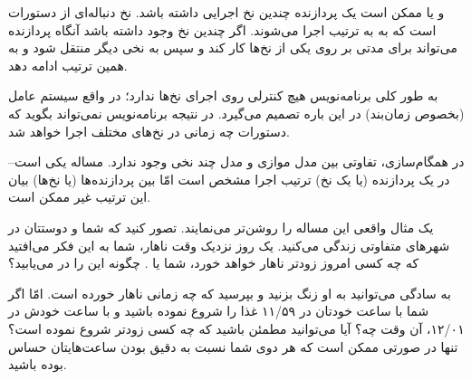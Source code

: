 \documentclass{book}
\begin{document}
    و یا ممکن است یک پردازنده چندین نخ اجرایی داشته باشد. نخ دنباله‌ای از دستورات است که به به ترتیب اجرا می‌شوند. 
    اگر چندین نخ وجود داشته باشد آنگاه پردازنده می‌تواند برای مدتی بر روی یکی  از نخ‌ها کار کند و سپس به نخی دیگر منتقل شود و به همین 
    ترتیب ادامه دهد. 

    به طور کلی برنامه‌نویس هیچ کنترلی روی اجرای نخ‌ها ندارد؛ در واقع سیستم عامل (بخصوص زمان‌بند) در این باره تصمیم‌ می‌گیرد. 
    در نتیجه برنامه‌نویس نمی‌تواند بگوید که دستورات چه زمانی در نخ‌های مختلف اجرا خواهد شد.
    

    در همگام‌سازی، تفاوتی بین مدل موازی و مدل چند نخی وجود ندارد. 
    مساله یکی است--در یک پردازنده (یا یک نخ) ترتیب اجرا مشخص است امّا بین پردازنده‌ها (یا نخ‌ها) بیان این ترتیب غیر ممکن است. 
    
    یک مثال واقعی این مساله را روشن‌تر می‌نمایند. 
    تصور کنید که شما و دوستتان  در شهرهای متفاوتی زندگی می‌کنید. یک روز نزدیک وقت ناهار، شما به این فکر می‌افتید که 
    چه کسی امروز زودتر ناهار خواهد خورد، شما یا . چگونه این را در می‌یابید؟ 
    

    به سادگی می‌توانید به او زنگ بزنید و بپرسید که چه زمانی ناهار خورده است. امّا اگر شما با ساعت خودتان در ۱۱/۵۹ غذا را شروع نموده باشید 
    و  با ساعت خودش در ۱۲/۰۱، آن وقت چه؟ آیا می‌توانید مطمئن باشید که چه کسی زودتر شروع نموده است؟ 
    تنها در صورتی ممکن است که هر دوی شما نسبت به دقیق بودن ساعت‌هایتان حساس بوده باشید.
\end{document}
